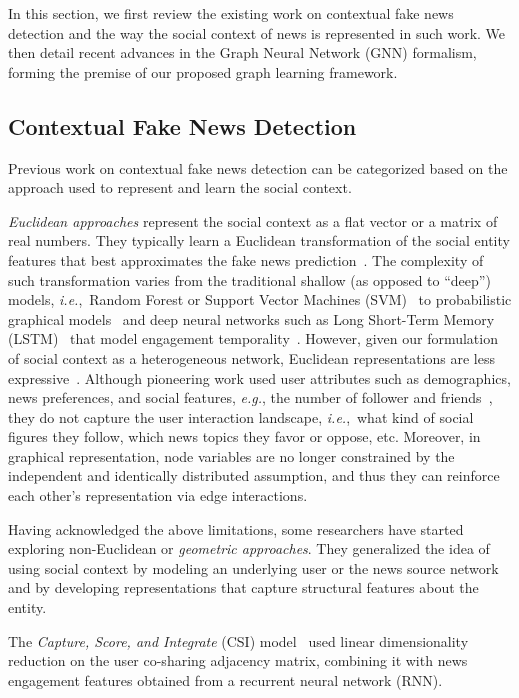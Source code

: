 \documentclass[sigconf]{acmart}
\theoremstyle{definition}
\theoremstyle{hypothesis}
\begin{document}
In this section, we first review the existing work on contextual fake news detection and the way the social context of news is represented in such work. We then detail recent advances in the Graph Neural Network (GNN) formalism, forming the premise of our proposed graph learning framework.

\subsection{Contextual Fake News Detection}
Previous work on contextual fake news detection can be categorized based on the approach used to represent and learn the social context. 

\emph{Euclidean approaches} represent the social context as a flat vector or a matrix of real numbers. 
They typically learn a Euclidean transformation of the social entity features that best approximates the fake news prediction~\cite{popat2016credibility}. The complexity of such transformation varies from the traditional shallow (as opposed to ``deep'') models, \textit{i.e.},~Random Forest or Support Vector Machines (SVM)~\cite{castillo2011information,yang2012automatic} to probabilistic graphical models~\cite{popat2017truth} and deep neural networks such as Long Short-Term Memory (LSTM)~\cite{lstm1997hochreiter} that model engagement temporality~\cite{ruchansky2017csi}. However, given our formulation of social context as a heterogeneous network, Euclidean representations are less expressive~\cite{bronstein2017geometric}. Although pioneering work used user attributes such as demographics, news preferences, and social features, \emph{e.g.}, the number of follower and friends~\cite{ma2015detect,shu2017fake}, they do not capture the user interaction landscape, \textit{i.e.},~what kind of social figures they follow, which news topics they favor or oppose, etc. Moreover, in graphical representation, node variables are no longer constrained by the independent and identically distributed assumption, and thus they can reinforce each other's representation via edge interactions.

Having acknowledged the above limitations, some researchers have started exploring non-Euclidean or \emph{geometric approaches}. They generalized the idea of using social context by modeling an underlying user or the news source network and by developing representations that capture structural features about the entity.

The \emph{Capture, Score, and Integrate} (CSI) model~\cite{ruchansky2017csi} used linear dimensionality reduction on the user co-sharing adjacency matrix, combining it with news engagement features obtained from a recurrent neural network (RNN). 
\end{document}
